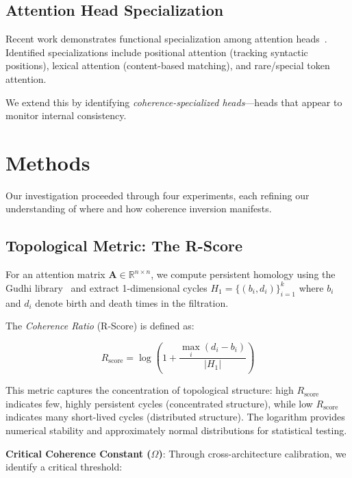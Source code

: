 \documentclass[11pt,twocolumn]{article}
\newcommand{\rscore}{R_{\text{score}}}
\newcommand{\hnorm}{H_1}
\begin{document}
\subsection{Attention Head Specialization}

Recent work demonstrates functional specialization among attention heads~\cite{voita2019analyzing,kobayashi2020attention,clark2019does}. Identified specializations include positional attention (tracking syntactic positions), lexical attention (content-based matching), and rare/special token attention.

We extend this by identifying \textit{coherence-specialized heads}---heads that appear to monitor internal consistency.

\section{Methods}

Our investigation proceeded through four experiments, each refining our understanding of where and how coherence inversion manifests.

\subsection{Topological Metric: The R-Score}

For an attention matrix $\mathbf{A} \in \mathbb{R}^{n \times n}$, we compute persistent homology using the Gudhi library~\cite{maria2014gudhi} and extract 1-dimensional cycles $\hnorm = \{(b_i, d_i)\}_{i=1}^{k}$ where $b_i$ and $d_i$ denote birth and death times in the filtration.

The \textit{Coherence Ratio} (R-Score) is defined as:

\begin{equation}
\rscore = \log\left(1 + \frac{\max_i(d_i - b_i)}{|\hnorm|}\right)
\label{eq:rscore}
\end{equation}

This metric captures the concentration of topological structure: high $\rscore$ indicates few, highly persistent cycles (concentrated structure), while low $\rscore$ indicates many short-lived cycles (distributed structure). The logarithm provides numerical stability and approximately normal distributions for statistical testing.

\textbf{Critical Coherence Constant ($\Omega$)}: Through cross-architecture calibration, we identify a critical threshold:
\end{document}
